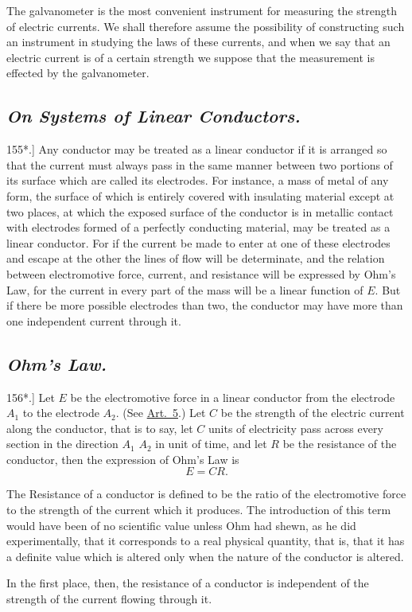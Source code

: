\documentclass[12pt,oneside]{book}[2021/10/04]
\newcommand{\Heading}{\centering\normalfont}
\newcommand{\Subsection}[1]{\subsection*{\normalsize\Heading\itshape #1}}
\newcommand{\Runhead}[1]{\fancyhead[C]{\iffloatpage{}{\small#1}}}
\newcommand{\article}[1]{\phantomsection \label{art:#1}{#1.]}}
\newcommand{\¬}{\hphantom{0}}
\begin{document}
The galvanometer is the most convenient instrument for measuring
the strength of electric currents. We shall therefore assume
the possibility of constructing such an instrument in studying the
laws of these currents, and when we say that an electric current is
of a certain strength we suppose that the measurement is effected
by the galvanometer.

\Subsection{On Systems of Linear Conductors.}

\article{155*} Any conductor may be treated as a linear conductor if it
is arranged so that the current must always pass in the same manner
between two portions of its surface which are called its electrodes.
For instance, a mass of metal of any form, the surface of which is
entirely covered with insulating material except at two places, at
which the exposed surface of the conductor is in metallic contact
with electrodes formed of a perfectly conducting material, may be
treated as a linear conductor. For if the current be made to enter
at one of these electrodes and escape at the other the lines of flow
will be determinate, and the relation between electromotive force,
current, and resistance will be expressed by Ohm's Law, for the
current in every part of the mass will be a linear function of \(E\).
But if there be more possible electrodes than two, the conductor
may have more than one independent current through it.

\Subsection{Ohm's Law.}
\Runhead{OHM'S LAW.}

\article{156*} Let \(E\) be the electromotive force in a linear conductor
from the electrode \(A_1\) to the electrode \(A_2\). (See \hyperref[art:5]{Art.\ 5}.) Let
\(C\) be the strength of the electric current along the conductor, that
is to say, let \(C\) units of electricity pass across every section in
the direction \(A_1\) \(A_2\) in unit of time, and let \(R\) be the resistance of
the conductor, then the expression of Ohm's Law is
\[
E = CR \text{.}\tag{1}
\]

The Resistance of a conductor is defined to be the ratio of
the electromotive force to the strength of the current which it
produces. The introduction of this term would have been of no
scientific value unless Ohm had shewn, as he did experimentally,
that it corresponds to a real physical quantity, that is, that it has
a definite value which is altered only when the nature of the conductor
is altered.

In the first place, then, the resistance of a conductor is independent
of the strength of the current flowing through it.
\end{document}
